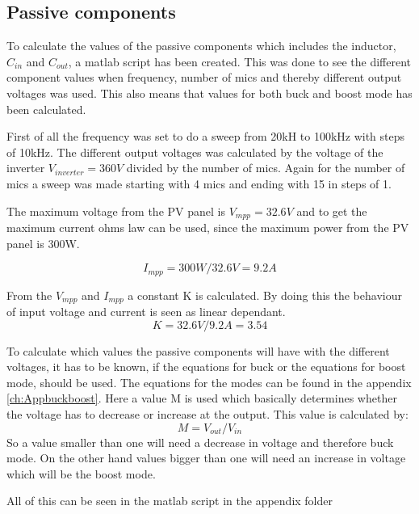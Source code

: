 \subsection{Passive components}  \label{passives}

To calculate the values of the passive components which includes the inductor, $C_{in}$ and $C_{out}$, a matlab  script has been created. This was done to see the different component values when frequency, number of mics and thereby different output voltages was used. This also means that values for both buck and boost mode has been calculated.

First of all the frequency was set to do a sweep from 20kH to 100kHz with steps of 10kHz. The different output voltages was calculated by the voltage of the inverter $V_{inverter}=360V$ divided by the number of mics. Again for the number of mics a sweep was made starting with 4 mics and ending with 15 in steps of 1.

The maximum voltage from the PV panel is $V_{mpp}=32.6V$ and to get the maximum current ohms law can be used, since the maximum power from the PV panel is 300W.

\begin{equation}
I_{mpp} = 300W/32.6V = 9.2A
\end{equation} 

From the $V_{mpp}$ and $I_{mpp}$ a constant K is calculated. By doing this the behaviour of input voltage and current is seen as linear dependant.
\begin{equation}
 K = 32.6V/9.2A = 3.54
 \end{equation} 
 
To calculate which values the passive components will have with the different voltages, it has to be known, if the equations for buck or the equations for boost mode, should be used. The equations for the modes can be found in the appendix \ref{ch:Appbuckboost}. Here a value M is used which basically determines whether the voltage has to decrease or increase at the output. This value is calculated by:
\begin{equation}
M = V_{out}/V_{in}
\end{equation}
So a value smaller than one will need a decrease in voltage and therefore buck mode. On the other hand values bigger than one will need an increase in voltage which will be the boost mode.

All of this can be seen in the matlab script in the appendix folder  

